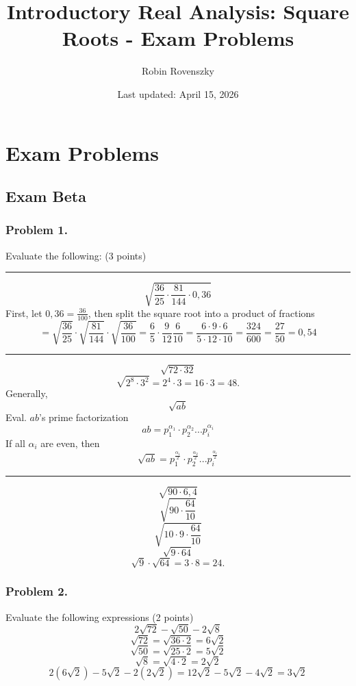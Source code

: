 \documentclass{article}
\title{Introductory Real Analysis: Square Roots - Exam Problems}
\author{Robin Rovenszky}
\date{Last updated: April 15, 2026}
\begin{document}
\maketitle
\tableofcontents
\newpage

\section{Exam Problems}
\subsection{Exam Beta}
\subsubsection{Problem 1.}
Evaluate the following: (3 points)
\vspace{8pt}
    \hrule
    \vspace{8pt}
    \[
    \sqrt{\frac{36}{25}\cdot\frac{81}{144}\cdot0,36}
    \]
    First, let $0,36 = \frac{36}{100}$, then split the square root into a product of fractions
    \[
    =\sqrt{\frac{36}{25}}\cdot \sqrt{\frac{81}{144}}\cdot\sqrt{\frac{36}{100}} = \frac{6}{5}\cdot\frac{9}{12}\frac{6}{10}=\frac{6\cdot9\cdot6}{5\cdot12\cdot10}=\frac{324}{600}=\frac{27}{50}=0,54
    \]
    \vspace{3pt}
    \hrule 
    \vspace{8pt}
    \[
    \sqrt{72 \cdot 32}
    \]
    \[
    \sqrt{2^8 \cdot 3^2} = 2^4 \cdot 3 = 16 \cdot 3 = 48.
    \]
    Generally,
    \[
    \sqrt{ab}
    \]
    Eval. $ab$'s prime factorization
    \[
    ab = p_1^{\alpha_1} \cdot p_2^{\alpha_2} ... p_i^{\alpha_i}
    \]
    If all $\alpha_i$ are even, then
    \[
    \sqrt{ab} = p_1^{\frac{\alpha_1}{2}} \cdot p_2^{\frac{\alpha_2}{2}} ... p_i^{\frac{\alpha_i}{2}}
    \]
    \vspace{3pt}
    \hrule
    \vspace{8pt}
    \[
    \sqrt{90\cdot6,4}
    \]
    \[
    \sqrt{90 \cdot \frac{64}{10}}
    \]
    \[
    \sqrt{10 \cdot 9 \cdot \frac{64}{10}}
    \]
    \[
    \sqrt{9 \cdot 64}
    \]
    \[
    \sqrt{9} \cdot \sqrt{64} = 3 \cdot 8 = 24.
    \]

\subsubsection{Problem 2.}
Evaluate the following expressions (2 points)
\[
2\sqrt{72} - \sqrt{50} - 2\sqrt{8}
\]
\[
\sqrt{72} = \sqrt{36 \cdot 2} = 6\sqrt{2}
\]
\[
\sqrt{50} = \sqrt{25 \cdot 2} = 5\sqrt{2}
\]
\[
\sqrt{8} = \sqrt{4 \cdot 2} = 2\sqrt{2}
\]
\[
2(6\sqrt{2}) - 5\sqrt{2} - 2(2\sqrt{2}) = 12\sqrt{2} - 5\sqrt{2} - 4\sqrt{2} = 3\sqrt{2}
\]
\end{document}
